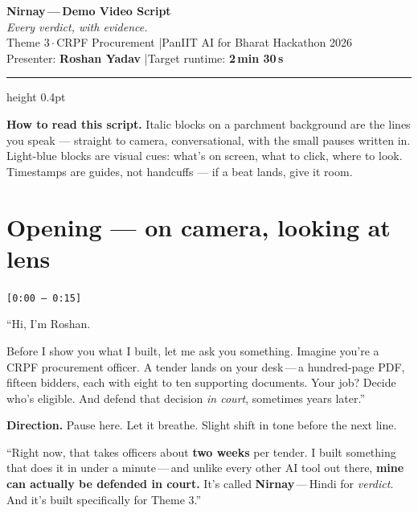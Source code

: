 \documentclass[11pt,a4paper]{article}
\newcommand{\ts}[1]{{\small\color{accent}\texttt{[#1]}}}
\begin{document}
\begin{center}
  {\Huge\bfseries\color{accent} Nirnay\,---\,Demo Video Script}\\[6pt]
  {\large\itshape Every verdict, with evidence.}\\[4pt]
  {\small Theme 3\,$\cdot$\,CRPF Procurement \quad|\quad PanIIT AI for Bharat Hackathon 2026}\\[2pt]
  {\small Presenter: \textbf{Roshan Yadav} \quad|\quad Target runtime: \textbf{2\,min 30\,s}}
\end{center}

\vspace{6pt}
\hrule height 0.4pt
\vspace{14pt}

\noindent\textbf{How to read this script.}
Italic blocks on a parchment background are the lines you speak --- straight to camera, conversational, with the small pauses written in. Light-blue blocks are visual cues: what's on screen, what to click, where to look. Timestamps are guides, not handcuffs --- if a beat lands, give it room.

\vspace{4pt}

\section{Opening --- on camera, looking at lens}
\ts{0:00 -- 0:15}

\begin{spoken}
``Hi, I'm Roshan.

\smallskip
Before I show you what I built, let me ask you something. Imagine you're a CRPF procurement officer. A tender lands on your desk\,---\,a hundred-page PDF, fifteen bidders, each with eight to ten supporting documents. Your job? Decide who's eligible. And defend that decision \emph{in court}, sometimes years later.''
\end{spoken}

\begin{cue}
\textbf{Direction.} Pause here. Let it breathe. Slight shift in tone before the next line.
\end{cue}

\begin{spoken}
``Right now, that takes officers about \textbf{two weeks} per tender. I built something that does it in under a minute\,---\,and unlike every other AI tool out there, \textbf{mine can actually be defended in court.} It's called \textbf{Nirnay}\,---\,Hindi for \emph{verdict}. And it's built specifically for Theme 3.''
\end{spoken}
\end{document}
